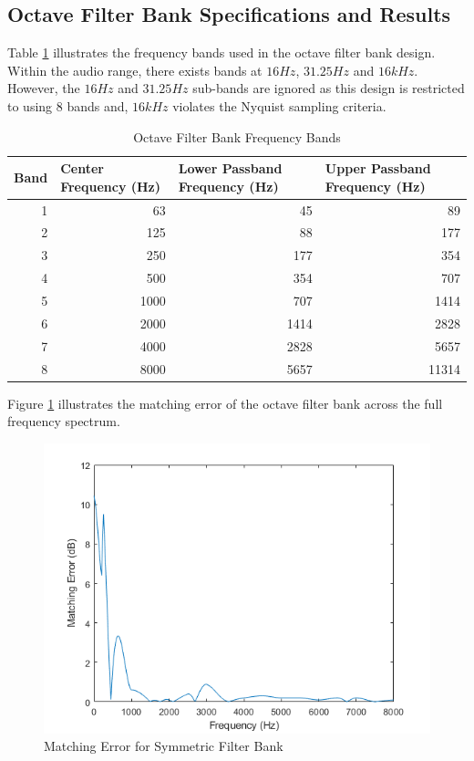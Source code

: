 \documentclass[12pt, onecolumn]{article}
\begin{document}
\begin{appendices}
\section{Octave Filter Bank Specifications and Results}
\label{app:octFreqBands}

\noindent Table \ref{tab:octFreqBands} illustrates the frequency bands used in the octave filter bank design. Within the audio range, there exists bands at $16Hz$, $31.25Hz$ and $16kHz$. However, the $16Hz$ and $31.25Hz$ sub-bands are ignored as this design is restricted to using $8$ bands and, $16kHz$ violates the Nyquist sampling criteria.

\begin{table}[htbp]
  \centering
  \caption{Octave Filter Bank Frequency Bands}
  \begin{adjustbox}{width=\linewidth}
    \begin{tabular}{|r|r|r|r|}
    \hline
    \multicolumn{1}{|l|}{\textbf{Band}} & \multicolumn{1}{l|}{\textbf{Center Frequency (Hz)}} & \multicolumn{1}{l|}{\textbf{Lower Passband Frequency (Hz)}} & \multicolumn{1}{l|}{\textbf{Upper Passband Frequency (Hz)}} \\
    \hline
    1     & 63    & 45    & 89 \\
    \hline
    2     & 125   & 88    & 177 \\
    \hline
    3     & 250   & 177   & 354 \\
    \hline
    4     & 500   & 354   & 707 \\
    \hline
    5     & 1000  & 707   & 1414 \\
    \hline
    6     & 2000  & 1414  & 2828 \\
    \hline
    7     & 4000  & 2828  & 5657 \\
    \hline
    8     & 8000  & 5657  & 11314 \\
    \hline
    \end{tabular}%
    \end{adjustbox}
  \label{tab:octFreqBands}%
\end{table}%

\noindent Figure \ref{fig:octMatErr} illustrates the matching error of the octave filter bank across the full frequency spectrum.

\begin{figure}[h]
\centering
\includegraphics[width=0.6\linewidth]{octMatErr.PNG}
\caption{Matching Error for Symmetric Filter Bank}
\label{fig:octMatErr}
\end{figure}  



\end{appendices}
\end{document}
